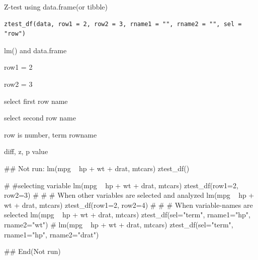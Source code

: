\documentclass[a4paper]{book}
\begin{document}
%
\begin{Description}
Z-test using data.frame(or tibble)
\end{Description}
%
\begin{Usage}
\begin{verbatim}
ztest_df(data, row1 = 2, row2 = 3, rname1 = "", rname2 = "", sel = "row")
\end{verbatim}
\end{Usage}
%
\begin{Arguments}
\begin{ldescription}
\item[\code{data}] lm() and data.frame

\item[\code{row1}] row1 = 2

\item[\code{row2}] row2 = 3

\item[\code{rname1}] select first row name

\item[\code{rname2}] select second row name

\item[\code{sel}] row is number, term rowname
\end{ldescription}
\end{Arguments}
%
\begin{Value}
diff, z, p value
\end{Value}
%
\begin{Examples}
\begin{ExampleCode}
\#\# Not run: 
 lm(mpg ~ hp + wt + drat, mtcars) %
 ztest_df()

# #selecting variable
lm(mpg ~ hp + wt + drat, mtcars) %
   ztest_df(row1=2, row2=3)
\#
# # When other variables are selected and analyzed
 lm(mpg ~ hp + wt + drat, mtcars) %
   ztest_df(row1=2, row2=4)
\#
# # When variable-names are selected
 lm(mpg ~ hp + wt + drat, mtcars) %
   ztest_df(sel="term", rname1="hp", rname2="wt")
\#
 lm(mpg ~ hp + wt + drat, mtcars) %
   ztest_df(sel="term", rname1="hp", rname2="drat")
 
## End(Not run)


\end{ExampleCode}
\end{Examples}
\end{document}
